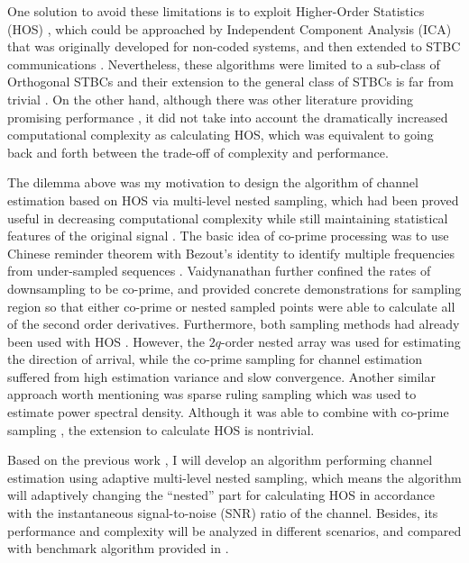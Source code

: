 \documentclass[letterpaper,10pt]{article}
\begin{document}
One solution to avoid these limitations is to exploit Higher-Order Statistics (HOS) \cite{Mendel:1991}, which could be approached by Independent Component Analysis (ICA) \cite{Hyvarinen:2001} that was originally developed for non-coded systems, and then extended to STBC communications \cite{Iglesias:2008}. Nevertheless, these algorithms were limited to a sub-class of Orthogonal STBCs and their extension to the general class of STBCs is far from trivial \cite{Iglesias:2008}. On the other hand, although there was other literature providing promising performance \cite{Choqueuse:2011}, it did not take into account the dramatically increased computational complexity as calculating HOS, which was equivalent to going back and forth between the trade-off of complexity and performance.

The dilemma above was my motivation to design the algorithm of channel estimation based on HOS via multi-level nested sampling, which had been proved useful in decreasing computational complexity while still maintaining statistical features of the original signal \cite{Pal:2010}. The basic idea of co-prime processing was to use Chinese reminder theorem with Bezout's identity to identify multiple frequencies from under-sampled sequences \cite{Xia:1999}. Vaidynanathan \cite{Vaidynanathan1:2011} further confined the rates of downsampling to be co-prime, and  provided concrete demonstrations for sampling region so that either co-prime or nested sampled points were able to calculate all of the second order derivatives. Furthermore, both sampling methods had already been used with HOS \cite{Pal:2012, Wu:2014}. However, the $2q$-order nested array was used for estimating the direction of arrival, while the co-prime sampling for channel estimation suffered from high estimation variance and slow convergence. Another similar approach worth mentioning was sparse ruling sampling \cite{Ariananda:2012} which was used to estimate power spectral density. Although it was able to combine with co-prime sampling \cite{Dominguez:2013}, the extension to calculate HOS is nontrivial.

Based on the previous work \cite{Wu:2014}, I will develop an algorithm performing channel estimation using adaptive multi-level nested sampling, which means the algorithm will adaptively changing the ``nested'' part for calculating HOS in accordance with the instantaneous signal-to-noise (SNR) ratio of the channel. Besides, its performance and complexity will be analyzed in different scenarios, and compared with benchmark algorithm provided in \cite{Choqueuse:2011}.
\end{document}
